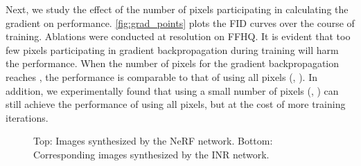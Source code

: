 \documentclass[10pt,twocolumn,letterpaper]{article}
\begin{document}
Next, we study the effect of the number of pixels participating in calculating the gradient on performance. \cref{fig:grad_points} plots the FID curves over the course of training. Ablations were conducted at  resolution on FFHQ. It is evident that too few pixels participating in gradient backpropagation during training will harm the performance. When the number of pixels for the gradient backpropagation reaches , the performance is comparable to that of using all pixels (\ie, ). In addition, we experimentally found that using a small number of pixels (\eg, ) can still achieve the performance of using all pixels, but at the cost of more training iterations.



\begin{figure}[!t]
  \footnotesize
  \centering
  \renewcommand{\tabcolsep}{5pt} \renewcommand{\arraystretch}{0}
  \vspace{-0.3cm}
  \caption{Top: Images synthesized by the NeRF network. Bottom: Corresponding images synthesized by the INR network. }
  \label{fig:nerf_inr_imgs}
  \vspace{-0.5cm}
\end{figure}
\end{document}
